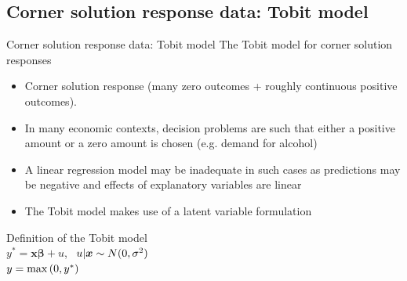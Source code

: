 \documentclass[usenames,dvipsnames]{beamer}
\newcommand{\mytikzmark}[2]{%
  \tikz[remember picture,inner sep=0pt,outer sep=0pt,baseline,anchor=base] 
    \node (#1) {\ensuremath{#2}};}
\begin{document}
\subsection{Corner solution response data: Tobit model}
\begin{frame}{Corner solution response data: Tobit model}
The Tobit model for corner solution responses
\begin{itemize}
\item Corner solution response (many zero outcomes + roughly continuous positive outcomes).
\item In many economic contexts, decision problems are such that either a positive amount or a zero amount is chosen (e.g. demand for alcohol)
\item A linear regression model may be inadequate in such cases as predictions may be negative and effects of explanatory variables are linear
\item The Tobit model makes use of a latent variable formulation
\end{itemize}
\bigskip
Definition of the Tobit model \\
\medskip
$y^{\ast} = \bm{x \beta} + u$, \ $u|\bm{x} \sim \mytikzmark{1}{N(0, \sigma^2)}$\\
$y = \max \mytikzmark{2}{(0,y^{\ast})}$
\end{frame}
\end{document}
